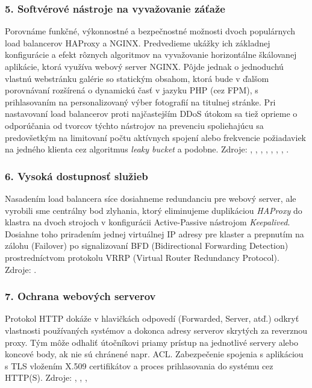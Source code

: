 \documentclass[11pt, a4paper]{article}
\begin{document}
\subsubsection*{5. Softvérové nástroje na vyvažovanie záťaže}
Porovnáme funkčné, výkonnostné a bezpečnostné 
možnosti dvoch populárnych load balancerov HAProxy a NGINX. Predvedieme ukážky ich základnej konfigurácie
a efekt rôznych algoritmov na vyvažovanie horizontálne škálovanej aplikácie, ktorá využíva webový server NGINX. Pôjde jednak o jednoduchú vlastnú webstránku galérie so statickým obsahom, ktorá bude
v ďalšom porovnávaní rozšírená o dynamickú časť v jazyku PHP (cez FPM), s prihlasovaním na personalizovaný výber fotografií na titulnej stránke. Pri nastavovaní load balancerov proti najčastejším DDoS útokom sa tiež oprieme o odporúčania od tvorcov týchto nástrojov na prevenciu spoliehajúcu sa predovšetkým na limitovaní počtu aktívnych spojení alebo frekvencie požiadaviek na jedného klienta cez algoritmus \emph{leaky bucket} a podobne. Zdroje: \cite{nginx-http-balancer}, \cite{nginx-cookbook}, 
\cite{haproxy-docs}, \cite{haproxy-ddos}, \cite{haproxy-ddos-L7}, \cite{haproxy-php-fpm}, 
\cite{nginx-ddos-protection}, \cite{haproxy-rate-limiting}.

\subsubsection*{6. Vysoká dostupnosť služieb}
Nasadením load balancera síce dosiahneme redundanciu pre webový 
server, ale vyrobili sme centrálny bod zlyhania, ktorý eliminujeme duplikáciou \emph{HAProxy} do klastra
na dvoch strojoch v konfigurácii Active-Passive nástrojom \emph{Keepalived}. Dosiahne toho priradením jednej 
virtuálnej IP adresy pre klaster a prepnutím na zálohu (Failover) po signalizovaní BFD (Bidirectional 
Forwarding Detection) prostredníctvom protokolu VRRP (Virtual Router Redundancy Protocol). Zdroje: 
\cite{keepalived-docs}.

\subsubsection*{7. Ochrana webových serverov}
Protokol HTTP dokáže v hlavičkách odpovedí (Forwarded, Server, 
atď.) odkryť vlastnosti používaných systémov a dokonca adresy serverov skrytých za reverznou proxy. Tým 
môže odhaliť útočníkovi priamy prístup na jednotlivé servery alebo koncové body, ak nie sú chránené napr. 
ACL. Zabezpečenie spojenia s aplikáciou s TLS vložením X.509 certifikátov a proces prihlasovania do 
systému cez HTTP(S). Zdroje: \cite{csirt-hardening}, \cite{csirt-web-checklist}, \cite{RFC2616}, 
\cite{http-headers}
\end{document}
